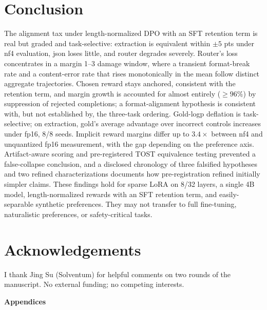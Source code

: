 \documentclass{article}
\begin{document}
\section{Conclusion}
The alignment tax under length-normalized DPO with an SFT retention term is real but graded and task-selective: extraction is equivalent within $\pm5$ pts under nf4 evaluation, json loses little, and router degrades severely. Router's loss concentrates in a margin 1--3 damage window, where a transient format-break rate and a content-error rate that rises monotonically in the mean follow distinct aggregate trajectories. Chosen reward stays anchored, consistent with the retention term, and margin growth is accounted for almost entirely (${\geq}96\%$) by suppression of rejected completions; a format-alignment hypothesis is consistent with, but not established by, the three-task ordering. Gold-logp deflation is task-selective; on extraction, gold's average advantage over incorrect controls increases under fp16, 8/8 seeds. Implicit reward margins differ up to $3.4\times$ between nf4 and unquantized fp16 measurement, with the gap depending on the preference axis. Artifact-aware scoring and pre-registered TOST equivalence testing prevented a false-collapse conclusion, and a disclosed chronology of three falsified hypotheses and two refined characterizations documents how pre-registration refined initially simpler claims. These findings hold for sparse LoRA on 8/32 layers, a single 4B model, length-normalized rewards with an SFT retention term, and easily-separable synthetic preferences. They may not transfer to full fine-tuning, naturalistic preferences, or safety-critical tasks.

\section*{Acknowledgements}
I thank Jing Su (Solventum) for helpful comments on two rounds of the manuscript. No external funding; no competing interests.




\appendix
\begin{center}
\vspace{0.5\baselineskip}
{\large\bfseries Appendices}
\end{center}

\end{document}
